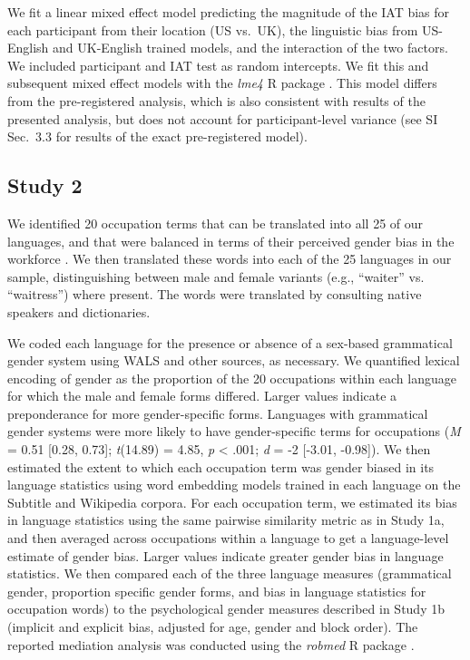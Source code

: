 \documentclass[9pt,twocolumn,twoside,lineno]{pnas-new}
\begin{document}
{We fit a linear mixed effect model predicting the magnitude of the IAT bias for each participant from their location (US vs.\ UK), the linguistic bias from US-English and UK-English trained models, and the interaction of the two factors. We included participant and IAT test as random intercepts. We fit this and subsequent mixed effect models with the \emph{lme4} R package \cite{lme4package}. This model differs from the pre-registered analysis, which is also consistent with results of the presented analysis, but does not account for participant-level variance (see SI Sec.\ 3.3 for results of the exact pre-registered model).


\subsection*{Study 2}

We identified 20 occupation terms that can be translated into  all 25 of our languages, and that were balanced in terms of their perceived gender bias in the workforce \cite{misersky2014norms}. We
then translated these words into each of the 25 languages in our sample,
distinguishing between male and female variants (e.g., \enquote{waiter}
vs. \enquote{waitress}) where present. The words were translated by
consulting native speakers and dictionaries.

We coded each language for the presence or absence of a sex-based grammatical gender system using WALS \cite{wals} and other sources, as necessary. We quantified lexical encoding of gender as the proportion of the 20 occupations within each language for which the male and female forms differed. Larger values indicate a preponderance for more gender-specific forms.  Languages with grammatical gender systems were more likely to have gender-specific terms for occupations
(\emph{M} = 0.51 {[}0.28, 0.73{]}; \emph{t}(14.89) = 4.85, \emph{p} \textless{} .001; \emph{d} = -2 {[}-3.01, -0.98{]}). We then estimated the extent to which each occupation term was gender biased in its language statistics using word
embedding models trained in each language on the Subtitle and Wikipedia
corpora. For each occupation term, we estimated its bias in language
statistics using the same pairwise similarity metric as in Study 1a, and
then averaged across occupations within a language to get a
language-level estimate of gender bias. Larger values indicate greater
gender bias in language statistics. We then compared each of the three
language measures (grammatical gender, proportion specific gender forms,
and bias in language statistics for occupation words) to the
psychological gender measures described in Study 1b (implicit and
explicit bias, adjusted for age, gender and block order). The reported mediation analysis was conducted using the \emph{robmed} R package \cite{robmed}.

}
\end{document}
